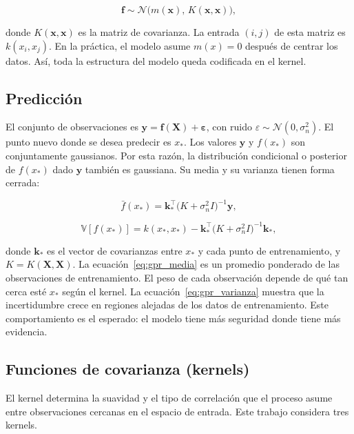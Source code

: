 \begin{equation}
\mathbf{f} \sim \mathcal{N}\big(m(\mathbf{x}),\, K(\mathbf{x},\mathbf{x})\big),
\end{equation}

donde $K(\mathbf{x},\mathbf{x})$ es la matriz de covarianza. La entrada $(i,j)$ de esta matriz es $k(x_i,x_j)$. En la práctica, el modelo asume $m(x)=0$ después de centrar los datos. Así, toda la estructura del modelo queda codificada en el kernel.

\subsection{Predicción}

El conjunto de observaciones es $\mathbf{y} = \mathbf{f}(\mathbf{X}) + \boldsymbol{\varepsilon}$, con ruido $\varepsilon\sim\mathcal{N}(0,\sigma_n^2)$. El punto nuevo donde se desea predecir es $x_*$. Los valores $\mathbf{y}$ y $f(x_*)$ son conjuntamente gaussianos. Por esta razón, la distribución condicional o posterior de $f(x_*)$ dado $\mathbf{y}$ también es gaussiana. Su media y su varianza tienen forma cerrada:

\begin{equation}
\bar{f}(x_*) = \mathbf{k}_*^\top \big(K + \sigma_n^2 I\big)^{-1} \mathbf{y},
\label{eq:gpr_media}
\end{equation}

\begin{equation}
\mathbb{V}[f(x_*)] = k(x_*,x_*) - \mathbf{k}_*^\top \big(K + \sigma_n^2 I\big)^{-1} \mathbf{k}_*,
\label{eq:gpr_varianza}
\end{equation}

donde $\mathbf{k}_*$ es el vector de covarianzas entre $x_*$ y cada punto de entrenamiento, y $K=K(\mathbf{X},\mathbf{X})$. La ecuación~\eqref{eq:gpr_media} es un promedio ponderado de las observaciones de entrenamiento. El peso de cada observación depende de qué tan cerca esté $x_*$ según el kernel. La ecuación~\eqref{eq:gpr_varianza} muestra que la incertidumbre crece en regiones alejadas de los datos de entrenamiento. Este comportamiento es el esperado: el modelo tiene más seguridad donde tiene más evidencia.

\subsection{Funciones de covarianza (kernels)}

El kernel determina la suavidad y el tipo de correlación que el proceso asume entre observaciones cercanas en el espacio de entrada. Este trabajo considera tres kernels.

